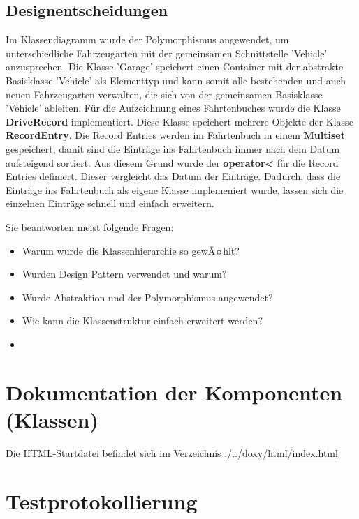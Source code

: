 \documentclass[12pt,naustrian,a4widepaper]{scrartcl}
\begin{document}
\subsection{Designentscheidungen}
Im Klassendiagramm wurde der Polymorphismus angewendet, um unterschiedliche Fahrzeugarten mit der gemeinsamen Schnittstelle 'Vehicle' anzusprechen. Die Klasse 'Garage' speichert einen Container mit der abstrakte Basisklasse 'Vehicle' als Elementtyp und kann somit alle bestehenden und auch neuen Fahrzeugarten verwalten, die sich von der gemeinsamen Basisklasse 'Vehicle' ableiten.
Für die Aufzeichnung eines Fahrtenbuches wurde die Klasse \textbf{DriveRecord} implementiert. Diese Klasse speichert mehrere Objekte der Klasse \textbf{RecordEntry}.
Die Record Entries werden im Fahrtenbuch in einem \textbf{Multiset} gespeichert, damit sind die Einträge ins Fahrtenbuch immer nach dem Datum aufsteigend sortiert.
Aus diesem Grund wurde der \textbf{operator<} für die Record Entries definiert. Dieser vergleicht das Datum der Einträge.
Dadurch, dass die Einträge ins Fahrtenbuch als eigene Klasse implemeniert wurde, lassen sich die einzelnen Einträge schnell und einfach erweitern.

Sie beantworten meist folgende Fragen:\\
\begin{itemize}
	\item Warum wurde die Klassenhierarchie so gewÃ¤hlt?
	\item Wurden Design Pattern verwendet und warum?
	\item Wurde Abstraktion und der Polymorphismus angewendet?
	\item Wie kann die Klassenstruktur einfach erweitert werden?
	\item 
\end{itemize}

\color{black}

\section{Dokumentation der Komponenten (Klassen)}
Die HTML-Startdatei befindet sich im Verzeichnis \href{run:./../doxy/html/index.html}{./../doxy/html/index.html}

\clearpage
\section{Testprotokollierung}


\clearpage
\end{document}
